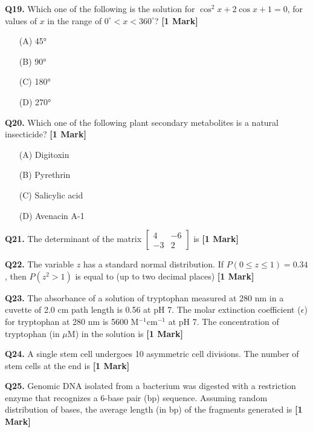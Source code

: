 \documentclass[11pt]{article}
\newcommand{\questiona}[2]{
    \noindent\textbf{Q#2.} #1 \hfill \textbf{[1 Mark]}
}
\begin{document}
\questiona{Which one of the following is the solution for \( \cos^2 x + 2 \cos x + 1 = 0 \), for values of \( x \) in the range of \( 0^\circ < x < 360^\circ \)?}{19}
\begin{enumerate}
    \item[(A)] 45°  
    \item[(B)] 90°  
    \item[(C)] 180°  
    \item[(D)] 270°  
\end{enumerate}
\vspace{0.5cm}

\questiona{Which one of the following plant secondary metabolites is a natural insecticide?}{20}
\begin{enumerate}
    \item[(A)] Digitoxin  
    \item[(B)] Pyrethrin  
    \item[(C)] Salicylic acid  
    \item[(D)] Avenacin A-1  
\end{enumerate}
\vspace{0.5cm}

\questiona{The determinant of the matrix \(\begin{bmatrix} 4 & -6 \\ -3 & 2 \end{bmatrix}\) is}{21}
\vspace{0.5cm}

\questiona{The variable \( z \) has a standard normal distribution. If \( P(0 \leq z \leq 1) = 0.34 \), then \( P(z^2 > 1) \) is equal to (up to two decimal places)}{22}
\vspace{0.5cm}

\questiona{The absorbance of a solution of tryptophan measured at 280 nm in a cuvette of 2.0 cm path length is 0.56 at pH 7. The molar extinction coefficient (\( \epsilon \)) for tryptophan at 280 nm is 5600 M\(^{-1}\)cm\(^{-1}\) at pH 7. The concentration of tryptophan (in $\mu$M) in the solution is}{23}
\vspace{0.5cm}

\questiona{A single stem cell undergoes 10 asymmetric cell divisions. The number of stem cells at the end is}{24}
\vspace{0.5cm}

\questiona{Genomic DNA isolated from a bacterium was digested with a restriction enzyme that recognizes a 6-base pair (bp) sequence. Assuming random distribution of bases, the average length (in bp) of the fragments generated is}{25}
\vspace{0.5cm}
\end{document}
